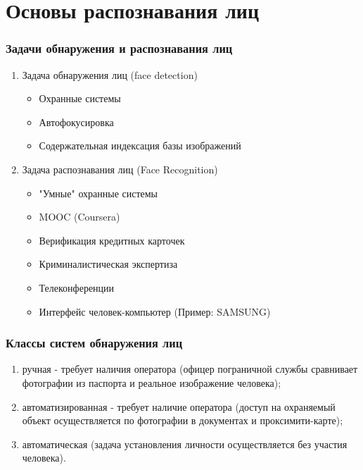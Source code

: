 \documentclass{beamer}
\begin{document}
\section{Основы распознавания лиц}

\begin{frame}
\frametitle{Задачи обнаружения и распознавания лиц}

\begin{enumerate}
\item Задача обнаружения лиц (face detection)
    \begin{itemize}
    \item Охранные системы
    \item Автофокусировка
    \item Содержательная индексация базы изображений
    \end{itemize}
\pause
\item Задача распознавания лиц (Face Recognition)
    \begin{itemize}
    \item "Умные" охранные системы
    \item MOOC (Coursera)
    \item Верификация кредитных карточек
    \item Криминалистическая экспертиза
    \item Телеконференции
    \item Интерфейс человек-компьютер (Пример: SAMSUNG)
    \end{itemize}
\end{enumerate}
\end{frame}


\begin{frame}
\frametitle{Классы систем обнаружения лиц}

\begin{enumerate}
\item ручная - требует наличия оператора (офицер пограничной службы сравнивает фотографии из паспорта и реальное изображение человека);
\item автоматизированная - требует наличие оператора (доступ на охраняемый объект осуществляется по фотографии в документах и проксимити-карте);
\item автоматическая (задача установления личности осуществляется без участия человека).
\end{enumerate}
\end{frame}
\end{document}
